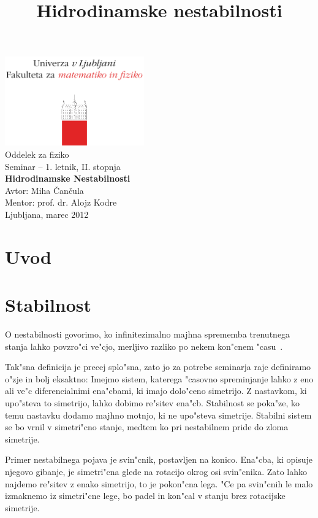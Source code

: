\documentclass[a4paper,10pt]{article}
\title{Hidrodinamske nestabilnosti}
\begin{document}
\begin{center}
\includegraphics[width=6cm]{../logo_fmf_uni-lj_sl}\\[0.5cm]
Oddelek za fiziko \\[2cm]
{ \large Seminar -- 1. letnik, II. stopnja } \\[1cm]
{ \huge \bf Hidrodinamske Nestabilnosti}\\[2cm]
{\large Avtor: Miha \v Can\v cula}\\[0.6cm]
{\large Mentor: prof. dr. Alojz Kodre} \\[0.6cm]
{\large Ljubljana, marec 2012}
\end{center}
\vfill

\begin{abstract}

\end{abstract}

\newpage

\tableofcontents

\section{Uvod}

\section{Stabilnost}

O nestabilnosti govorimo, ko infinitezimalno majhna sprememba trenutnega stanja lahko povzro"ci ve"cjo, merljivo razliko po nekem kon"cnem "casu~\cite{drazin}. 

Tak"sna definicija je precej splo"sna, zato jo za potrebe seminarja raje definiramo o"zje in bolj eksaktno: Imejmo sistem, katerega "casovno spreminjanje lahko z eno ali ve"c diferencialnimi ena"cbami, ki imajo dolo"ceno simetrijo. Z nastavkom, ki upo"steva to simetrijo, lahko dobimo re"sitev ena"cb. Stabilnost se poka"ze, ko temu nastavku dodamo majhno motnjo, ki ne upo"steva simetrije. Stabilni sistem se bo vrnil v simetri"cno stanje, medtem ko pri nestabilnem pride do zloma simetrije. 

Primer nestabilnega pojava je svin"cnik, postavljen na konico. Ena"cba, ki opisuje njegovo gibanje, je simetri"cna glede na rotacijo okrog osi svin"cnika. Zato lahko najdemo re"sitev z enako simetrijo, to je pokon"cna lega. "Ce pa svin"cnih le malo izmaknemo iz simetri"cne lege, bo padel in kon"cal v stanju brez rotacijske simetrije. 
\end{document}
